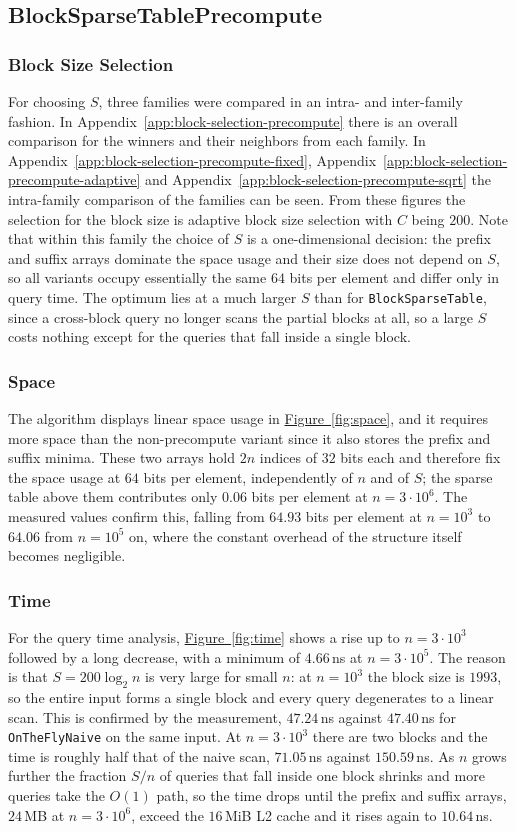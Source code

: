 \documentclass[a4paper,UKenglish,cleveref,thm-restate]{lipics-v2021}
\begin{document}
\subsection{BlockSparseTablePrecompute}
\subsubsection{Block Size Selection}
For choosing $S$, three families were compared in an intra- and inter-family fashion.
In Appendix~\ref{app:block-selection-precompute} there is an overall comparison for the winners and their neighbors from each family.
In Appendix~\ref{app:block-selection-precompute-fixed}, Appendix~\ref{app:block-selection-precompute-adaptive} and Appendix~\ref{app:block-selection-precompute-sqrt} the intra-family comparison of the families can be seen.
From these figures the selection for the block size is adaptive block size selection with $C$ being $200$.
Note that within this family the choice of $S$ is a one-dimensional decision: the prefix and suffix arrays dominate the space usage and their size does not depend on $S$, so all variants occupy essentially the same $64$ bits per element and differ only in query time.
The optimum lies at a much larger $S$ than for \texttt{BlockSparseTable}, since a cross-block query no longer scans the partial blocks at all, so a large $S$ costs nothing except for the queries that fall inside a single block.
\subsubsection{Space}
The algorithm displays linear space usage in \hyperref[fig:space]{Figure~\ref*{fig:space}}, and it requires more space than the non-precompute variant since it also stores the prefix and suffix minima.
These two arrays hold $2n$ indices of $32$ bits each and therefore fix the space usage at $64$ bits per element, independently of $n$ and of $S$; the sparse table above them contributes only $0.06$ bits per element at $n = 3 \cdot 10^6$.
The measured values confirm this, falling from $64.93$ bits per element at $n=10^3$ to $64.06$ from $n=10^5$ on, where the constant overhead of the structure itself becomes negligible.
\subsubsection{Time}
For the query time analysis, \hyperref[fig:time]{Figure~\ref*{fig:time}} shows a rise up to $n=3 \cdot 10^3$ followed by a long decrease, with a minimum of $4.66$\,ns at $n=3 \cdot 10^5$.
The reason is that $S = 200 \log_2 n$ is very large for small $n$: at $n=10^3$ the block size is $1993$, so the entire input forms a single block and every query degenerates to a linear scan.
This is confirmed by the measurement, $47.24$\,ns against $47.40$\,ns for \texttt{OnTheFlyNaive} on the same input.
At $n=3 \cdot 10^3$ there are two blocks and the time is roughly half that of the naive scan, $71.05$\,ns against $150.59$\,ns.
As $n$ grows further the fraction $S/n$ of queries that fall inside one block shrinks and more queries take the $O(1)$ path, so the time drops until the prefix and suffix arrays, $24$\,MB at $n=3 \cdot 10^6$, exceed the $16$\,MiB L2 cache and it rises again to $10.64$\,ns.
\end{document}
